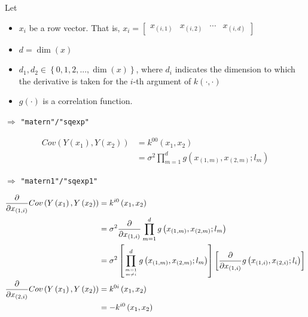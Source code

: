 \documentclass{sfuthesis}
\begin{document}
Let 
\begin{itemize}
  \item $x_i$ be a row vector. That is,  
  ${x_i} = \left[ {\begin{array}{*{20}{c}}
{{x_{\left( {i,1} \right)}}}&{{x_{\left( {i,2} \right)}}}& \cdots &{{x_{\left( {i,d} \right)}}}
\end{array}} \right]$ 
  \item $d = \dim(x)$
  \item $d_1, d_2 \in \left\{ {0,1,2,...,\dim \left( x \right)} \right\}$, where $d_i$ indicates the dimension to which the derivative is taken for the $i$-th argument of $k(\cdot, \cdot)$
  \item $g(\cdot)$ is a correlation function. 
\end{itemize}

\bigskip
{} $\Rightarrow$ \texttt{"matern"/"sqexp"} 

\begin{align}
  Cov\left( {Y\left( {{x_1}} \right),Y\left( {{x_2}} \right)} \right) &= {k^{00}}\left( {{x_1},{x_2}} \right)\\
 &= {\sigma ^2}\prod\limits_{m = 1}^d {g\left( {{x_{\left( {1,m} \right)}},{x_{\left( {2,m} \right)}};{l_m}} \right)}
\end{align}

\bigskip
{} $\Rightarrow$ \texttt{"matern1"/"sqexp1"}

\begin{align}
  \frac{\partial }{{\partial {x_{\left( {1,i} \right)}}}}Cov\left( {Y\left( {{x_1}} \right),Y\left( {{x_2}} \right)} \right) &= {k^{i0}}\left( {{x_1},{x_2}} \right)\\
 &= {\sigma ^2}\frac{\partial }{{\partial {x_{\left( {1,i} \right)}}}}\prod\limits_{m = 1}^d {g\left( {{x_{\left( {1,m} \right)}},{x_{\left( {2,m} \right)}};{l_m}} \right)} \\
 &= {\sigma ^2}\left[ {\prod\limits_{m = 1\atop
m \ne i}^d {g\left( {{x_{\left( {1,m} \right)}},{x_{\left( {2,m} \right)}};{l_m}} \right)} } \right]\left[ {\frac{\partial }{{\partial {x_{\left( {1,i} \right)}}}}g\left( {{x_{\left( {1,i} \right)}},{x_{\left( {2,i} \right)}};{l_i}} \right)} \right]\\
\frac{\partial }{{\partial {x_{\left( {2,i} \right)}}}}Cov\left( {Y\left( {{x_1}} \right),Y\left( {{x_2}} \right)} \right) &= {k^{0i}}\left( {{x_1},{x_2}} \right)\\
 &=  - {k^{i0}}\left( {{x_1},{x_2}} \right)
\end{align}
\end{document}
